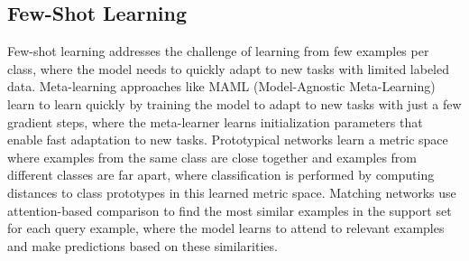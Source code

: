 \subsection{Few-Shot Learning}

Few-shot learning addresses the challenge of learning from few examples per class, where the model needs to quickly adapt to new tasks with limited labeled data. Meta-learning approaches like MAML (Model-Agnostic Meta-Learning) learn to learn quickly by training the model to adapt to new tasks with just a few gradient steps, where the meta-learner learns initialization parameters that enable fast adaptation to new tasks. Prototypical networks learn a metric space where examples from the same class are close together and examples from different classes are far apart, where classification is performed by computing distances to class prototypes in this learned metric space. Matching networks use attention-based comparison to find the most similar examples in the support set for each query example, where the model learns to attend to relevant examples and make predictions based on these similarities.





